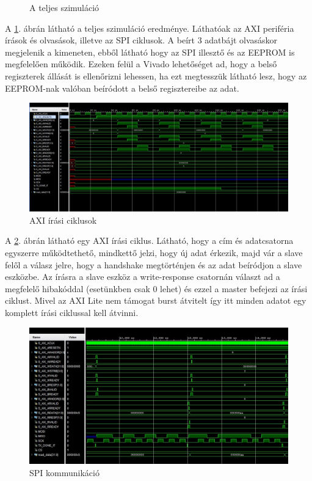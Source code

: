 \documentclass[a4paper,11pt]{article}
\begin{document}
\begin{figure}[H]
\begin{center}
	\caption{A teljes szimuláció}
	\label{fig:sim_complete}
	\end{center}
\end{figure}

A \ref{fig:sim_complete}. ábrán látható a teljes szimuláció eredménye. Láthatóak az AXI periféria írások és olvasások, illetve az SPI ciklusok. A beírt 3 adatbájt olvasáskor megjelenik a kimeneten, ebből látható hogy az SPI illesztő és az EEPROM is megfelelően működik. Ezeken felül a Vivado lehetőséget ad, hogy a belső regiszterek állását is ellenőrizni lehessen, ha ezt megtesszük látható lesz, hogy az EEPROM-nak valóban beíródott a belső regisztereibe az adat.

\begin{figure}[H]
	\begin{center}
	\includegraphics[scale=0.5]{axi_write.JPG}
	\caption{AXI írási ciklusok}	
	\label{fig:axi_write}
	\end{center}
\end{figure}

A \ref{fig:axi_write}. ábrán látható egy AXI írási ciklus. Látható, hogy a cím és adatcsatorna egyszerre működtethető, mindkettő jelzi, hogy új adat érkezik, majd vár a slave felől a válasz jelre, hogy a handshake megtörténjen és az adat beíródjon a slave eszközbe. Az írásra a slave eszköz a write-response csatornán választ ad a megfelelő hibakóddal (esetünkben csak 0 lehet) és ezzel a master befejezi az írási ciklust. Mivel az AXI Lite nem támogat burst átvitelt így itt minden adatot egy komplett írási ciklussal kell átvinni.

\begin{figure}[H]
	\begin{center}
	\includegraphics[scale=0.7]{SPI.JPG}	
	\end{center}
	\caption{SPI kommunikáció}
	\label{fig:spisim}
\end{figure}
\end{document}
